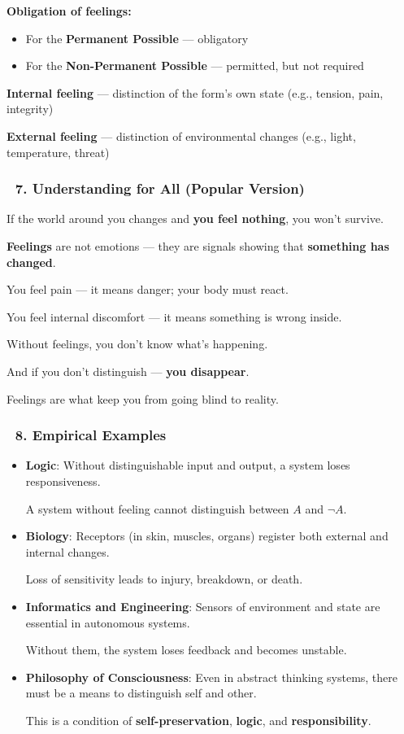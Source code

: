 \documentclass[12pt]{article}
\begin{document}
\textbf{Obligation of feelings:}
\begin{itemize}
\item For the \textbf{Permanent Possible} — obligatory
\item For the \textbf{Non-Permanent Possible} — permitted, but not required
\end{itemize}

\textbf{Internal feeling} — distinction of the form’s own state (e.g., tension, pain, integrity)

\textbf{External feeling} — distinction of environmental changes (e.g., light, temperature, threat)

\subsubsection*{🔹 7. Understanding for All (Popular Version)}
If the world around you changes and \textbf{you feel nothing}, you won’t survive.

\textbf{Feelings} are not emotions — they are signals showing that \textbf{something has changed}.

You feel pain — it means danger; your body must react.

You feel internal discomfort — it means something is wrong inside.

Without feelings, you don’t know what’s happening.

And if you don’t distinguish — \textbf{you disappear}.

Feelings are what keep you from going blind to reality.

\subsubsection*{🔹 8. Empirical Examples}
\begin{itemize}
\item \textbf{Logic}:
Without distinguishable input and output, a system loses responsiveness.

A system without feeling cannot distinguish between $A$ and $\neg A$.

\item \textbf{Biology}:
Receptors (in skin, muscles, organs) register both external and internal changes.

Loss of sensitivity leads to injury, breakdown, or death.

\item \textbf{Informatics and Engineering}:
Sensors of environment and state are essential in autonomous systems.

Without them, the system loses feedback and becomes unstable.

\item \textbf{Philosophy of Consciousness}:
Even in abstract thinking systems, there must be a means to distinguish self and other.

This is a condition of \textbf{self-preservation}, \textbf{logic}, and \textbf{responsibility}.
\end{itemize}
\end{document}
